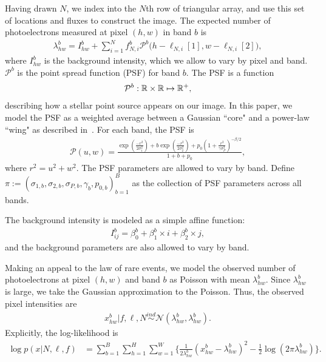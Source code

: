 Having drawn $N$, we index into the $N$th row of triangular array, and use this set of locations and fluxes to construct 
the image. The expected number of photoelectrons measured at pixel $(h,w)$ in band $b$ is
\begin{align}
  \lambda^b_{hw} = I^{b}_{hw} + \sum_{i = 1}^N f_{N, i}^b \mathcal{P}^b\big(h - \ell_{N, i}[1], w - \ell_{N,i}[2]\big),
  \label{eq:expected_intensity}
\end{align}
where $I^{b}_{hw}$ is the background intensity, which we allow to vary by pixel and band. $\mathcal{P}^b$ is the point spread function (PSF) for band $b$. The PSF
is a function 
\begin{align}
\mathcal{P}^b : \mathbb{R} \times \mathbb{R} \mapsto \mathbb{R}^+,
\end{align}
describing how a stellar point source appears
on our image. In this paper, we model the PSF as a weighted average between a Gaussian ``core" and a power-law ``wing" as described in~\cite{Xin2018psf}. For each band, the PSF is 
\begin{align}
    \mathcal{P}(u,w) = \frac{\exp(\frac{-r^2}{2\sigma_1^2}) + 
                            b \exp(\frac{-r^2}{2\sigma_2^2}) + 
                            p_0(1 + \frac{r^2}{\gamma\sigma^2_P})^{-\beta/2} }{1 + b + p_0},
\end{align}
where $r^2 = u^2 + w^2$. The PSF parameters are allowed to vary by band. Define 
$\pi := (\sigma_{1,b}, \sigma_{2,b}, \sigma_{P,b}, \gamma_b, p_{0,b})_{b=1}^B$ as the collection of PSF parameters across all bands. 

The background intensity is modeled as a simple affine function: 
\begin{align}
    I_{ij}^{b} = \beta_0^{b} + \beta_1^{b} \times i + \beta_2^{b} \times j,
\end{align}
and the background parameters are also allowed to vary by band. 

Making an appeal to the law of rare events, we model the
observed number of photoelectrons at pixel $(h,w)$ and band $b$ as Poisson
with mean $\lambda^b_{hw}$. Since $\lambda^b_{hw}$ is large,
we take the Gaussian approximation to the Poisson.
Thus, the observed pixel intensities are
\begin{align}
  x_{hw}^b | f, \ell, N \overset{ind}{\sim} \mathcal{N}(\lambda^b_{hw}, \lambda^b_{hw}).
\end{align}
Explicitly, the log-likelihood is
\begin{align}
    \log p(x | N, \ell, f) &= \sum_{b = 1}^{B} \sum_{h = 1}^H \sum_{w = 1}^W 
        \Big\{\frac{1}{2\lambda^b_{hw}}(x_{hw}^b  - \lambda^b_{hw})^2 - 
               \frac{1}{2}\log(2\pi\lambda^b_{hw})\Big\}
    \label{eq:loglik}.
\end{align}

